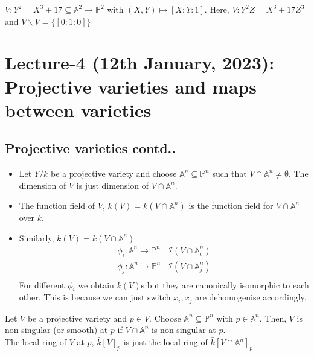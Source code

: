 \documentclass[oneside, 12pt]{scrbook}
\newcommand{\I}{\mathcal{I}}
\newcommand{\Aa}{\mathbb{A}}
\newcommand{\PP}{\mathbb{P}}
\theoremstyle{theorem}
\begin{document}
\begin{example}
$V : Y^2 = X^3 + 17 \subseteq \mathbb{A}^2 \rightarrow \mathbb{P}^2$ with $(X,Y) \mapsto [X: Y: 1]$. Here, $\overline{V} : Y^2Z =X^3 +17Z^3$ and $\overline{V} \backslash V = \{[0:1:0]\}$
\end{example}

\chapter{Lecture-4 (12th January, 2023): Projective varieties and maps between varieties}

\section{Projective varieties contd..}

\begin{definition}
\begin{itemize}
\item Let $Y / k$ be a projective variety and choose $\Aa^n \subseteq \PP^n$ such that $V \cap \Aa^n \neq \emptyset$. The dimension of $V$ is just dimension of $V \cap \Aa^n$.
\item The function field of $V$, $\bar{k}(V) = \bar{k}(V \cap \Aa^n)$ is the function field for $V \cap \Aa^n$ over $\bar{k}$.
\item Similarly, $k(V) = k(V \cap \Aa^n)$
\begin{align*}
\phi_{i}: \Aa^n \rightarrow \PP^n &\I(V \cap \Aa_{i}^n) \\
\phi_{j}: \Aa^n \rightarrow \PP^n &\I(V \cap \Aa_{j}^n) \\ 
\end{align*}
For different $\phi_{i}$ we obtain $k(V)$s but they are canonically isomorphic to each other. This is because we can just switch $x_{i},x_{j}$ are dehomogenise accordingly. 
\end{itemize}
\end{definition}

\begin{definition}
Let $V$ be a projective variety and $p \in V$. Choose $\Aa^n \subseteq \PP^n$ with $p \in \Aa^n$. Then, $V$ is non-singular (or smooth) at $p$ if $V\cap \Aa^n$ is non-singular at $p$. \\

The local ring of $V$ at $p$, $\bar{k}[V]_{p}$ is just the local ring of $\bar{k}[V \cap \Aa^n]_{p}$
\end{definition}
\end{document}
